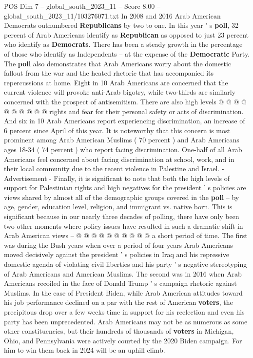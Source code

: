 \begin{textsample}{POS Dim 7 – global\_south\_2023\_11 – Score 8.00 – global\_south\_2023\_11/103276071.txt}
In 2008 and 2016 Arab American Democrats outnumbered \textbf{Republicans} by two to one.
In this year ' s \textbf{poll}, 32 percent of Arab Americans identify as \textbf{Republican} as opposed to just 23 percent who identify as \textbf{Democrats}.
There has been a steady growth in the percentage of those who identify as Independents -- at the expense of the \textbf{Democratic} Party.
The \textbf{poll} also demonstrates that Arab Americans worry about the domestic fallout from the war and the heated rhetoric that has accompanied its repercussions at home.
Eight in 10 Arab Americans are concerned that the current violence will provoke anti-Arab bigotry, while two-thirds are similarly concerned with the prospect of antisemitism.
There are also high levels @ @ @ @ @ @ @ @ @ @ rights and fear for their personal safety or acts of discrimination.
And six in 10 Arab Americans report experiencing discrimination, an increase of 6 percent since April of this year.
It is noteworthy that this concern is most prominent among Arab American Muslims ( 70 percent ) and Arab Americans ages 18-34 ( 74 percent ) who report facing discrimination.
One-half of all Arab Americans feel concerned about facing discrimination at school, work, and in their local community due to the recent violence in Palestine and Israel. - Advertisement - Finally, it is significant to note that both the high levels of support for Palestinian rights and high negatives for the president ' s policies are views shared by almost all of the demographic groups covered in the \textbf{poll} -- by age, gender, education level, religion, and immigrant vs. native born.
This is significant because in our nearly three decades of polling, there have only been two other moments where policy issues have resulted in such a dramatic shift in Arab American views -- @ @ @ @ @ @ @ @ @ @ a short period of time.
The first was during the Bush years when over a period of four years Arab Americans moved decisively against the president ' s policies in Iraq and his repressive domestic agenda of violating civil liberties and his party ' s negative stereotyping of Arab Americans and American Muslims.
The second was in 2016 when Arab Americans recoiled in the face of Donald Trump ' s campaign rhetoric against Muslims.
In the case of President Biden, while Arab American attitudes toward his job performance declined on a par with the rest of American \textbf{voters}, the precipitous drop over a few weeks time in support for his reelection and even his party has been unprecedented.
Arab Americans may not be as numerous as some other constituencies, but their hundreds of thousands of \textbf{voters} in Michigan, Ohio, and Pennsylvania were actively courted by the 2020 Biden campaign.
For him to win them back in 2024 will be an uphill climb.

\end{textsample}
